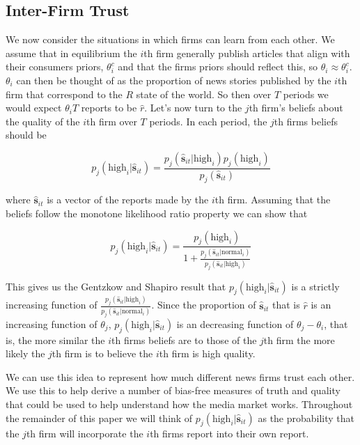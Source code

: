 \documentclass[a4paper]{article}
\begin{document}
\subsection{Inter-Firm Trust}
  
We now consider the situations in which firms can learn from each other.  We assume that in equilibrium the $i$th firm generally publish articles that align with their consumers priors, $\theta_i^c$ and that the firms priors should reflect this, so $\theta_i \approx \theta_i^c$.  $\theta_i$ can then be thought of as the proportion of news stories published by the $i$th firm that correspond to the $R$ state of the world.  So then over $T$ periods we would expect $\theta_iT$ reports to be $\hat{r}$.  Let's now turn to the $j$th firm's beliefs about the quality of the $i$th firm over $T$ periods.  In each period, the $j$th firms beliefs should be
 
 \[p_j(\text{high}_i|\hat{\textbf{s}}_{it}) = \frac{p_j(\hat{\textbf{s}}_{it}|\text{high}_i)p_j(\text{high}_i)}{p_j(\hat{\textbf{s}}_{it})}\]

where $\hat{\textbf{s}}_{it}$ is a vector of the reports made by the $i$th firm.  Assuming that the beliefs follow the monotone likelihood ratio property we can show that

\[p_j(\text{high}_i|\hat{\textbf{s}}_{it}) = \frac{p_j(\text{high}_i)}{1 + \frac{p_j(\hat{\textbf{s}}_{it}|\text{normal}_i)}{p_j(\hat{\textbf{s}}_{it}|\text{high}_i)}}\]

This gives us the Gentzkow and Shapiro result that $p_j(\text{high}_i|\hat{\textbf{s}}_{it})$ is a strictly increasing function of $\frac{p_j(\hat{\textbf{s}}_{it}|\text{high}_i)}{p_j(\hat{\textbf{s}}_{it}|\text{normal}_i)}$.  Since the proportion of $\hat{\textbf{s}}_{it}$ that is $\hat{r}$ is an increasing function of $\theta_j$,  $p_j(\text{high}_i|\hat{\textbf{s}}_{it})$ is an decreasing function of $\theta_j - \theta_i$, that is, the more similar the $i$th firms beliefs are to those of the $j$th firm the more likely the $j$th firm is to believe the $i$th firm is high quality.

We can use this idea to represent how much different news firms trust each other.  We use this to help derive a number of bias-free measures of truth and quality that could be used to help understand how the media market works.  Throughout the remainder of this paper we will think of $p_j(\text{high}_i|\hat{\textbf{s}}_{it})$ as the probability that the $j$th firm will incorporate the $i$th firms report into their own report.
\end{document}
